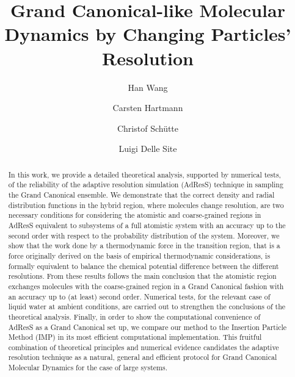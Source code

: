 \documentclass[aip,jcp,a4paper,reprint,onecolumn]{revtex4-1}
\newcommand{\redc}[1]{{\color{red} #1}}
\begin{document}
\title{\redc{Grand Canonical-like Molecular Dynamics by Changing Particles' Resolution}}
\author{Han Wang}
\author{Carsten Hartmann}
\author{Christof Sch\"utte}
\author{Luigi Delle Site}

\begin{abstract}
  In this work, we provide a detailed theoretical analysis, supported by numerical tests, of the
  reliability of the adaptive resolution simulation (AdResS) technique in sampling the Grand Canonical
  ensemble. We demonstrate that the correct density and radial distribution
  functions in the hybrid region, where molecules change resolution, are two necessary conditions for
  considering the atomistic and coarse-grained regions in AdResS equivalent to subsystems
  of a full atomistic system with an accuracy up to the second order with respect to the probability distribution of the system. Moreover, we show that the
  work done by a thermodynamic force in the transition region, that is a force originally derived on the basis of empirical thermodynamic considerations, is formally equivalent to balance the chemical
  potential difference between the different resolutions. From these results follows the main conclusion that the atomistic region exchanges
  molecules with the coarse-grained region in a Grand Canonical
  fashion with an accuracy up to (at least) second order. Numerical tests, for the relevant case of liquid water at ambient conditions, are carried out to strengthen the conclusions of the theoretical analysis.
  \redc{Finally, in order to show the computational convenience of AdResS as a Grand Canonical set up, we compare our method to the Insertion Particle Method (IMP) in its most efficient computational implementation.} 
  This fruitful combination of theoretical principles and numerical evidence candidates the adaptive resolution technique as a natural, general and efficient protocol for Grand Canonical Molecular Dynamics for the case of large systems.
\end{abstract}

\maketitle
\end{document}
